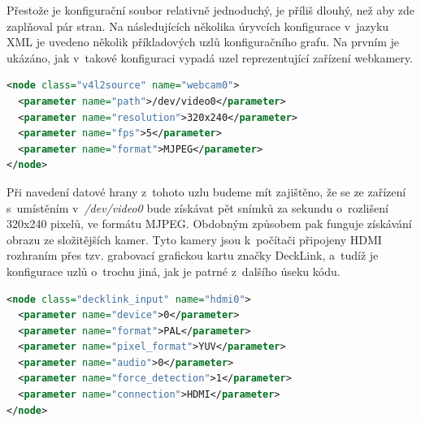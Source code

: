 \documentclass[thesis=M,czech]{FITthesis}[2012/06/26]
\begin{document}
Přestože je konfigurační soubor relativně jednoduchý, je příliš dlouhý, než aby zde zaplňoval pár stran. Na následujících několika úryvcích konfigurace v~jazyku XML je uvedeno několik příkladových uzlů konfiguračního grafu. Na prvním je ukázáno, jak v~takové konfiguraci vypadá uzel reprezentující zařízení webkamery.\\

\begin{lstlisting}[language=XML]
<node class="v4l2source" name="webcam0">
  <parameter name="path">/dev/video0</parameter>
  <parameter name="resolution">320x240</parameter>
  <parameter name="fps">5</parameter>
  <parameter name="format">MJPEG</parameter>
</node>
\end{lstlisting}

Při navedení datové hrany z~tohoto uzlu budeme mít zajištěno, že se ze zařízení s~umístěním v~\textit{/dev/video0} bude získávat pět snímků za sekundu o~rozlišení 320x240 pixelů, ve formátu MJPEG. Obdobným způsobem pak funguje získávání obrazu ze složitějších kamer. Tyto kamery jsou k~počítači připojeny HDMI rozhraním přes tzv. grabovací grafickou kartu značky DeckLink, a~tudíž je konfigurace uzlů o~trochu jiná, jak je patrné z~dalšího úseku kódu.\\

\begin{lstlisting}[language=XML]
<node class="decklink_input" name="hdmi0">
  <parameter name="device">0</parameter>
  <parameter name="format">PAL</parameter>
  <parameter name="pixel_format">YUV</parameter>
  <parameter name="audio">0</parameter>
  <parameter name="force_detection">1</parameter>
  <parameter name="connection">HDMI</parameter>
</node>
\end{lstlisting}
\end{document}
